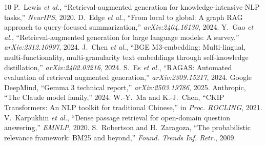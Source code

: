 \documentclass[10pt,conference,letterpaper]{IEEEtran}
\begin{document}
\begin{thebibliography}{10}
 P.~Lewis \textit{et al.}, ``Retrieval-augmented generation for knowledge-intensive NLP tasks,'' \textit{NeurIPS}, 2020.
 D.~Edge \textit{et al.}, ``From local to global: A graph RAG approach to query-focused summarization,'' \textit{arXiv:2404.16130}, 2024.
 Y.~Gao \textit{et al.}, ``Retrieval-augmented generation for large language models: A survey,'' \textit{arXiv:2312.10997}, 2024.
 J.~Chen \textit{et al.}, ``BGE M3-embedding: Multi-lingual, multi-functionality, multi-granularity text embeddings through self-knowledge distillation,'' \textit{arXiv:2402.03216}, 2024.
 S.~Es \textit{et al.}, ``RAGAS: Automated evaluation of retrieval augmented generation,'' \textit{arXiv:2309.15217}, 2024.
 Google DeepMind, ``Gemma 3 technical report,'' \textit{arXiv:2503.19786}, 2025.
 Anthropic, ``The Claude model family,'' 2024.
 W.-Y.~Ma and K.-J.~Chen, ``CKIP Transformers: An NLP toolkit for traditional Chinese,'' in \textit{Proc. ROCLING}, 2021.
 V.~Karpukhin \textit{et al.}, ``Dense passage retrieval for open-domain question answering,'' \textit{EMNLP}, 2020.
 S.~Robertson and H.~Zaragoza, ``The probabilistic relevance framework: BM25 and beyond,'' \textit{Found. Trends Inf. Retr.}, 2009.
\end{thebibliography}
\end{document}

